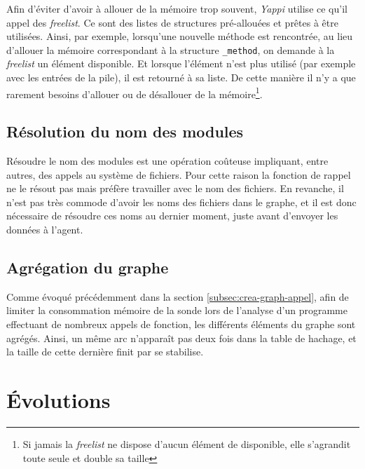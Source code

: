 \begin{note}[freelist]
Afin d'éviter d'avoir à allouer de la mémoire trop souvent, \emph{Yappi} utilise ce qu'il appel des \emph{freelist}. Ce sont des listes de structures pré-allouées et prêtes à être utilisées. Ainsi, par exemple, lorsqu'une nouvelle méthode est rencontrée, au lieu d'allouer la mémoire correspondant à la structure \verb|_method|, on demande à la \emph{freelist} un élément disponible. Et lorsque l'élément n'est plus utilisé (par exemple avec les entrées de la pile), il est retourné à sa liste. De cette manière il n'y a que rarement besoins d'allouer ou de désallouer de la mémoire\footnote{Si jamais la \emph{freelist} ne dispose d'aucun élément de disponible, elle s'agrandit toute seule et double sa taille}.
\end{note}

\subsection{Résolution du nom des modules}
Résoudre le nom des modules est une opération coûteuse impliquant, entre autres, des appels au système de fichiers. Pour cette raison la fonction de rappel ne le résout pas mais préfère travailler avec le nom des fichiers. En revanche, il n'est pas très commode d'avoir les noms des fichiers dans le graphe, et il est donc nécessaire de résoudre ces noms au dernier moment, juste avant d'envoyer les données à l'agent.

\subsection{Agrégation du graphe}
Comme évoqué précédemment dans la section \vref{subsec:crea-graph-appel}, afin de limiter la consommation mémoire de la sonde lors de l'analyse d'un programme effectuant de nombreux appels de fonction, les différents éléments du graphe sont agrégés. Ainsi, un même arc n’apparaît pas deux fois dans la table de hachage, et la taille de cette dernière finit par se stabilise.
\clearpage
  \section{Évolutions}
  	
